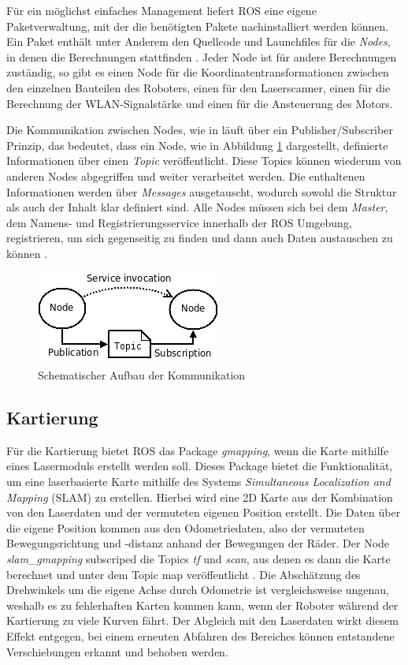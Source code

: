 \documentclass{scrartcl}%
\begin{document}
Für ein möglichst einfaches Management liefert ROS eine eigene Paketverwaltung, mit der die benötigten Pakete nachinstalliert werden können. Ein Paket enthält unter Anderem den Quellcode und Launchfiles für die \textit{Nodes}, in denen die Berechnungen stattfinden \cite{rosIntro2}. Jeder Node ist für andere Berechnungen zuständig, so gibt es einen Node für die Koordinatentransformationen zwischen den einzelnen Bauteilen des Roboters, einen für den Laserscanner, einen für die Berechnung der WLAN-Signalstärke und einen für die Ansteuerung des Motors.

Die Kommunikation zwischen Nodes, wie in  läuft über ein Publisher/Subscriber Prinzip, das bedeutet, dass ein Node, wie in Abbildung \ref{concept} dargestellt, definierte Informationen über einen \textit{Topic} veröffentlicht. Diese Topics können wiederum von anderen Nodes abgegriffen und weiter verarbeitet werden. Die enthaltenen Informationen werden über \textit{Messages} ausgetauscht, wodurch sowohl die Struktur als auch der Inhalt klar definiert sind. Alle Nodes müssen sich bei dem \textit{Master}, dem Namens- und Registrierungsservice innerhalb der ROS Umgebung, registrieren, um sich gegenseitig zu finden und dann auch Daten austauschen zu können \cite{rosKonzept}.

\begin{figure}
	\centering
	\includegraphics{bilder/ROS_concepts.png}
	\caption{Schematischer Aufbau der Kommunikation \cite{rosKonzept}}
	\label{concept}
\end{figure}

\subsection{Kartierung}
\label{kartierung}
Für die Kartierung bietet ROS das Package \textit{gmapping}, wenn die Karte mithilfe eines Lasermoduls erstellt werden soll. Dieses Package bietet die Funktionalität, um eine laserbasierte Karte mithilfe des Systems \textit{Simultaneous Localization and Mapping} (SLAM) zu erstellen. Hierbei wird eine 2D Karte aus der Kombination von den Laserdaten und der vermuteten eigenen Position erstellt. Die Daten über die eigene Position kommen aus den Odometriedaten, also der vermuteten Bewegungsrichtung und -distanz anhand der Bewegungen der Räder. Der Node \textit{slam\_gmapping} subscriped die Topics \textit{tf} und \textit{scan}, aus denen es dann die Karte berechnet und unter dem Topic map veröffentlicht \cite{gmap}. Die Abschätzung des Drehwinkels um die eigene Achse durch Odometrie ist vergleichsweise ungenau, weshalb es zu fehlerhaften Karten kommen kann, wenn der Roboter während der Kartierung zu viele Kurven fährt. Der Abgleich mit den Laserdaten wirkt diesem Effekt entgegen, bei einem erneuten Abfahren des Bereiches können entstandene Verschiebungen erkannt und behoben werden.
\end{document}
